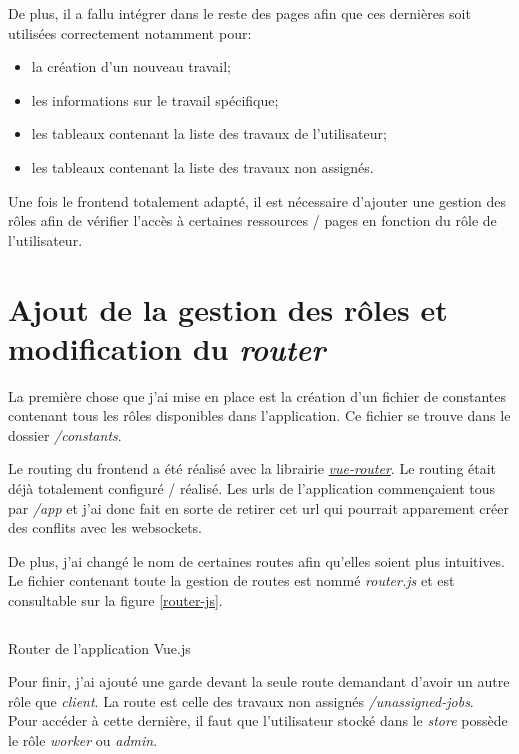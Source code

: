 \documentclass[
    iai, %
    il, %
]{heig-tb}
\begin{document}
De plus, il a fallu intégrer dans le reste des pages afin que ces dernières soit utilisées correctement notamment pour:
\begin{itemize}
    \item la création d'un nouveau travail;
    \item les informations sur le travail spécifique;
    \item les tableaux contenant la liste des travaux de l'utilisateur;
    \item les tableaux contenant la liste des travaux non assignés.
\end{itemize}

Une fois le \Gls{frontend} totalement adapté, il est nécessaire d'ajouter une gestion des rôles afin de vérifier l'accès à certaines ressources / pages en fonction du rôle de l'utilisateur.

\section{Ajout de la gestion des rôles et modification du \emph{router}}
La première chose que j'ai mise en place est la création d'un fichier de constantes contenant tous les rôles disponibles dans l'application. Ce fichier se trouve dans le dossier \emph{/constants}.

Le routing du \Gls{frontend} a été réalisé avec la librairie \href{https://router.vuejs.org/}{\emph{vue-router}}. Le routing était déjà totalement configuré / réalisé. Les \Gls{url}s de l'application commençaient tous par \emph{/app} et j'ai donc fait en sorte de retirer cet \Gls{url} qui pourrait apparement créer des conflits avec les \Gls{websockets}.

De plus, j'ai changé le nom de certaines routes afin qu'elles soient plus intuitives. Le fichier contenant toute la gestion de routes est nommé \emph{router.js} et est consultable sur la figure \ref{router-js}.

\begin{listing}[h]
    \inputminted{javascript}{assets/code/router.js}
    \caption{Router de l'application Vue.js \label{router-js}}
\end{listing}

Pour finir, j'ai ajouté une garde devant la seule route demandant d'avoir un autre rôle que \emph{client}. La route est celle des travaux non assignés \emph{/unassigned-jobs}. \\
Pour accéder à cette dernière, il faut que l'utilisateur stocké dans le \emph{store} possède le rôle \emph{worker} ou \emph{admin}.
\end{document}
